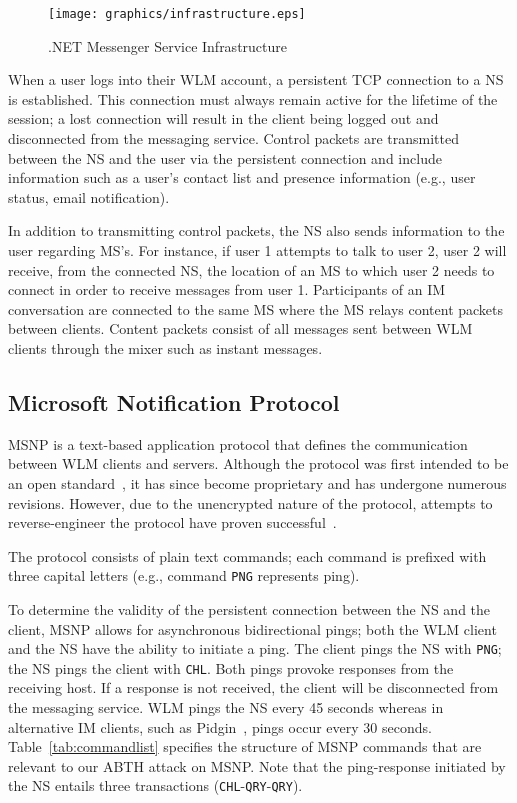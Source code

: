 \documentclass{sig-alternate}
\begin{document}
\begin{figure}[h]
	\centering
	\caption{.NET Messenger Service Infrastructure}
	\label{fig:wlminfrastructure}
	\texttt{[image: graphics/infrastructure.eps]}
\end{figure}

When a user logs into their WLM account, a persistent TCP connection to a NS is established.
This connection must always remain active for the lifetime of the session; a lost connection will result in the client being logged out and disconnected from the messaging service.
Control packets are transmitted between the NS and the user via the persistent connection and include information such as a user's contact list and presence information (e.g., user status, email notification).

In addition to transmitting control packets, the NS also sends information to the user regarding MS's.
For instance, if user 1 attempts to talk to user 2, user 2 will receive, from the connected NS, the location of an MS to which user 2 needs to connect in order to receive messages from user 1.
Participants of an IM conversation are connected to the same MS where the MS relays content packets between clients.
Content packets consist of all messages sent between WLM clients through the mixer such as instant messages.

\subsection{Microsoft Notification Protocol}

MSNP is a text-based application protocol that defines the communication between WLM clients and servers.
Although the protocol was first intended to be an open standard~\cite{fout:insidewlm}, it has since become proprietary and has undergone numerous revisions.
However, due to the unencrypted nature of the protocol, attempts to reverse-engineer the protocol have proven successful~\cite{hypothetic:msnp, msnfanatic:msnp}.

The protocol consists of plain text commands; each command is prefixed with three capital letters (e.g., command \texttt{PNG} represents ping).

To determine the validity of the persistent connection between the NS and the client, MSNP allows for asynchronous bidirectional pings; both the WLM client and the NS have the ability to initiate a ping.
The client pings the NS with \texttt{PNG}; the NS pings the client with \texttt{CHL}.
Both pings provoke responses from the receiving host. 
If a response is not received, the client will be disconnected from the messaging service.
WLM pings the NS every 45 seconds whereas in alternative IM clients, such as Pidgin~\cite{pidgin:url}, pings occur every 30 seconds.
Table~\ref{tab:commandlist} specifies the structure of MSNP commands that are relevant to our ABTH attack on MSNP.
Note that the ping-response initiated by the NS entails three transactions (\texttt{CHL}-\texttt{QRY}-\texttt{QRY}).
\end{document}
